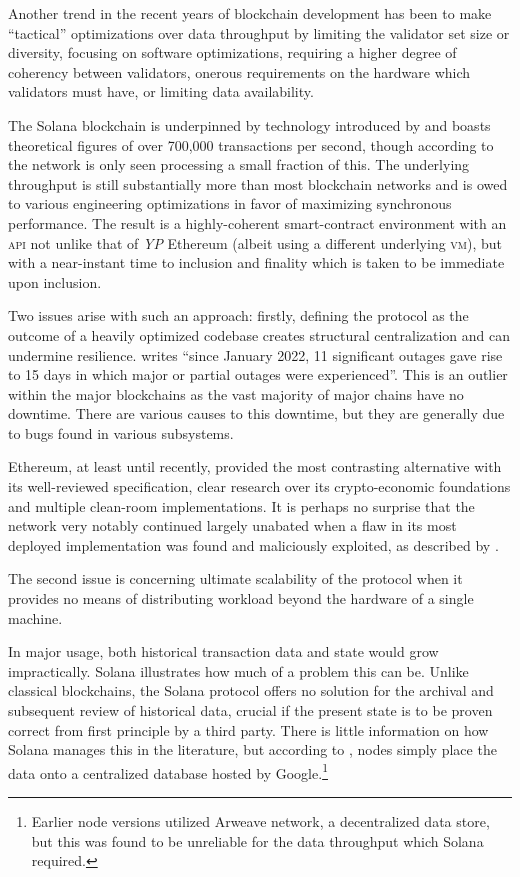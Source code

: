 Another trend in the recent years of blockchain development has been to make ``tactical'' optimizations over data throughput by limiting the validator set size or diversity, focusing on software optimizations, requiring a higher degree of coherency between validators, onerous requirements on the hardware which validators must have, or limiting data availability.

The Solana blockchain is underpinned by technology introduced by \cite{yakovenko2018solana} and boasts theoretical figures of over 700,000 transactions per second, though according to \cite{ng2024is} the network is only seen processing a small fraction of this. The underlying throughput is still substantially more than most blockchain networks and is owed to various engineering optimizations in favor of maximizing synchronous performance. The result is a highly-coherent smart-contract environment with an \textsc{api} not unlike that of \emph{YP} Ethereum (albeit using a different underlying \textsc{vm}), but with a near-instant time to inclusion and finality which is taken to be immediate upon inclusion.

Two issues arise with such an approach: firstly, defining the protocol as the outcome of a heavily optimized codebase creates structural centralization and can undermine resilience. \cite{jha2024solana} writes ``since January 2022, 11 significant outages gave rise to 15 days in which major or partial outages were experienced''. This is an outlier within the major blockchains as the vast majority of major chains have no downtime. There are various causes to this downtime, but they are generally due to bugs found in various subsystems.

Ethereum, at least until recently, provided the most contrasting alternative with its well-reviewed specification, clear research over its crypto-economic foundations and multiple clean-room implementations. It is perhaps no surprise that the network very notably continued largely unabated when a flaw in its most deployed implementation was found and maliciously exploited, as described by \cite{hertig2016so}.

The second issue is concerning ultimate scalability of the protocol when it provides no means of distributing workload beyond the hardware of a single machine.

In major usage, both historical transaction data and state would grow impractically. Solana illustrates how much of a problem this can be. Unlike classical blockchains, the Solana protocol offers no solution for the archival and subsequent review of historical data, crucial if the present state is to be proven correct from first principle by a third party. There is little information on how Solana manages this in the literature, but according to \cite{solana2023solana}, nodes simply place the data onto a centralized database hosted by Google.\footnote{Earlier node versions utilized Arweave network, a decentralized data store, but this was found to be unreliable for the data throughput which Solana required.}

